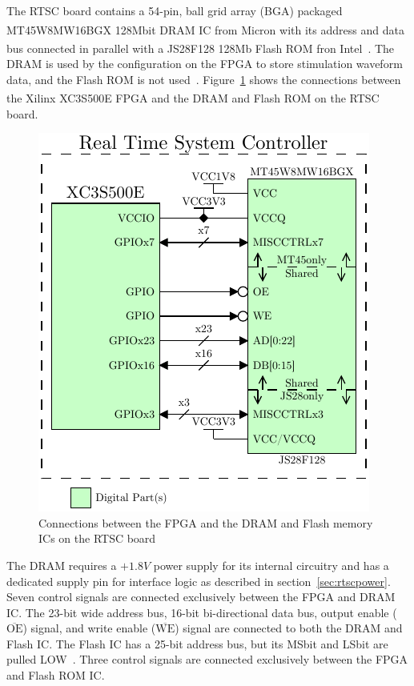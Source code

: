 The RTSC board contains a 54-pin, ball grid array (BGA) packaged MT45W8MW16BGX 128Mbit DRAM IC from Micron\textsuperscript{\textregistered} with its address and data bus connected in parallel with a JS28F128 128Mb Flash ROM fron Intel\textsuperscript{\textregistered}~\cite{DigilentNexys2rm}.  The DRAM is used by the configuration on the FPGA to store stimulation waveform data, and the Flash ROM is not used~\cite{BatzerMSEE}.  Figure~\ref{fig:dram} shows the connections between the Xilinx\textsuperscript{\textregistered} XC3S500E FPGA and the DRAM and Flash ROM on the RTSC board.

\begin{figure}[htb]
	\begin{singlespace}
	\centering	
		\includegraphics{./figures/DRAM} 
	\caption{Connections between the FPGA and the DRAM and Flash memory ICs on the RTSC board~\cite{DigilentNexys2rm,DigilentNexys2sch}\label{fig:dram}}
	\end{singlespace}
\end{figure}

The DRAM requires a $+1.8\unit{V}$ power supply for its internal circuitry and has a dedicated supply pin for interface logic as described in section~\ref{sec:rtscpower}.  Seven control signals are connected exclusively between the FPGA and DRAM IC.  The 23-bit wide address bus, 16-bit bi-directional data bus, output enable ($\overline{\mathrm{OE}}$) signal, and write enable ($\overline{\mathrm{WE}}$) signal are connected to both the DRAM and Flash IC.  The Flash IC has a 25-bit address bus, but its MSbit and LSbit are pulled LOW~\cite{DigilentNexys2sch}.  Three control signals are connected exclusively between the FPGA and Flash ROM IC.